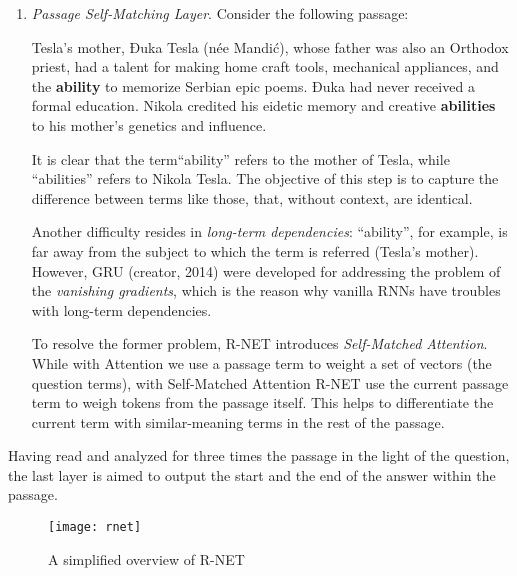 \begin{enumerate}
  \item \textit{Passage Self-Matching Layer}. Consider the following passage:
  
  \begin{displayquote}
  Tesla’s mother, Đuka Tesla (née Mandić), whose father was also an Orthodox priest, had a talent for making home craft tools, mechanical appliances, and the \textbf{ability} to memorize Serbian epic poems. Đuka had never received a formal education. Nikola credited his eidetic memory and creative \textbf{abilities} to his mother’s genetics and influence.
  \end{displayquote}
  
  It is clear that the term``ability'' refers to the mother of Tesla, while ``abilities'' refers to Nikola Tesla. The objective of this step is to capture the difference between terms like those, that, without context, are identical.
  
  Another difficulty resides in \textit{long-term dependencies}: ``ability'', for example, is far away from the subject to which the term is referred (Tesla's mother). However, GRU (creator, 2014) were developed for addressing the problem of the \textit{vanishing gradients}, which is the reason why vanilla RNNs have troubles with long-term dependencies.
  
  To resolve the former problem, R-NET introduces \textit{Self-Matched Attention}. While with Attention we use a passage term to weight a set of vectors (the question terms), with Self-Matched Attention R-NET use the current passage term to weigh tokens from the passage itself. This helps to differentiate the current term with similar-meaning terms in the rest of the passage.
\end{enumerate}

Having read and analyzed for three times the passage in the light of the question, the last layer is aimed to output the start and the end of the answer within the passage.

\begin{figure}[t]
\centering
\texttt{[image: rnet]}
\caption{A simplified overview of R-NET}
\medskip
\end{figure}

